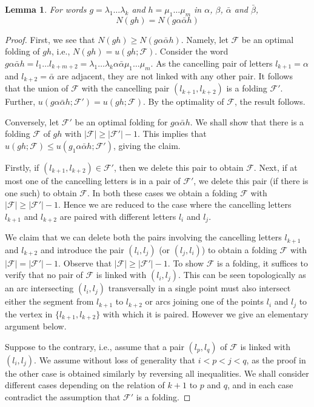 \documentclass{amsart}
\theoremstyle{plain}
\newtheorem{lemma}[theorem]{Lemma}
\theoremstyle{definition}
\theoremstyle{remark}
\newcommand{\F}{\mathcal{F}}
\renewcommand{\a}{\alpha}
\renewcommand{\b}{\beta}
\newcommand{\ba}{\bar{\alpha}}
\newcommand{\bb}{\bar{\beta}}
\begin{document}
\begin{lemma}
For words $g=\lambda_1\dots \lambda_k$ and $h=\mu_1\dots \mu_m$ in $\a$, $\b$, $\ba$ and $\bb$, 
$$N(gh)=N(g\a\ba h)$$
\end{lemma}
\begin{proof}
First, we see that $N(gh)\geq N(g\a\ba h)$. Namely, let $\F$ be an optimal folding of $gh$, i.e., $N(gh)=u(gh;\F)$. Consider the word $g\a\ba h=l_1\dots l_{k+m+2}=\lambda_1\dots \lambda_k\a\ba\mu_1\dots \mu_m$. As the cancelling pair of letters $l_{k+1}=\a$ and $l_{k+2}=\ba$ are adjacent, they are not linked with any other pair. It follows that the union of $\F$ with the cancelling pair $(l_{k+1},l_{k+2})$ is a folding $\F'$. Further, $u(g\a\ba h;\F')=u(gh;\F)$. By the optimality of $\F$, the result follows.

Conversely, let $\F'$ be an optimal folding for $g\a \ba h$. We shall show that there is a folding $\F$ of $gh$ with $\vert \F\vert\geq\vert\F'\vert-1$. This implies that $u(gh;\F)\leq u(g_1\a \ba h;\F')$, giving the claim. 

Firstly, if  $(l_{k+1},l_{k+2})\in\F'$, then we delete this pair to obtain $\F$. Next, if at most one of the cancelling letters is in a pair of $\F'$, we delete this pair (if there is one such) to obtain $\F$. In both these cases we obtain a folding $\F$ with $\vert \F\vert\geq\vert\F'\vert-1$.
Hence we are reduced to the case where the cancelling letters $l_{k+1}$ and $l_{k+2}$ are paired with different letters $l_i$ and $l_j$.

We claim that we can delete both the pairs involving the cancelling letters $l_{k+1}$ and $l_{k+2}$ and introduce the pair $(l_i,l_j)$ (or $(l_j,l_i)$) to obtain a folding $\F$ with $\vert \F\vert=\vert\F'\vert-1$. Observe that $\vert\F\vert\geq\vert\F'\vert-1$. To show $\F$ is a folding, it suffices to verify that no pair of $\F$ is linked with $(l_i,l_j)$. This can be seen topologically as an arc intersecting $(l_i,l_j)$ transversally in a single point must also intersect either the segment from $l_{k+1}$ to $l_{k+2}$ or arcs joining one of the points $l_i$ and $l_j$ to the vertex in $\{l_{k+1},l_{k+2}\}$ with which it is paired. However we give an elementary argument below. 

Suppose to the contrary, i.e., assume that a pair $(l_p,l_q)$ of $\F$ is linked with $(l_i,l_j)$. We assume without loss of generality that $i<p<j<q$, as the proof in the other case is obtained similarly by reversing all inequalities. We shall consider different cases depending on the relation of $k+1$ to $p$ and $q$, and in each case contradict the assumption that $\F'$ is a folding.


\end{proof}
\end{document}
